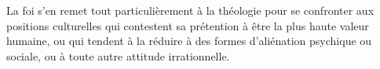 La foi s’en remet tout particulièrement
à la théologie pour se confronter aux positions
culturelles qui contestent sa prétention
à être la plus haute valeur humaine,
ou qui tendent à la réduire à des formes
d’aliénation psychique ou sociale, ou à
toute autre attitude irrationnelle.

